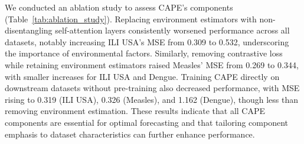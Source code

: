 We conducted an ablation study to assess CAPE's components (Table~\ref{tab:ablation_study}). Replacing environment estimators with non-disentangling self-attention layers consistently worsened performance across all datasets, notably increasing ILI USA's MSE from 0.309 to 0.532, underscoring the importance of environmental factors. Similarly, removing contrastive loss while retaining environment estimators raised Measles' MSE from 0.269 to 0.344, with smaller increases for ILI USA and Dengue. Training CAPE directly on downstream datasets without pre-training also decreased performance, with MSE rising to 0.319 (ILI USA), 0.326 (Measles), and 1.162 (Dengue), though less than removing environment estimation. These results indicate that all CAPE components are essential for optimal forecasting and that tailoring component emphasis to dataset characteristics can further enhance performance.


